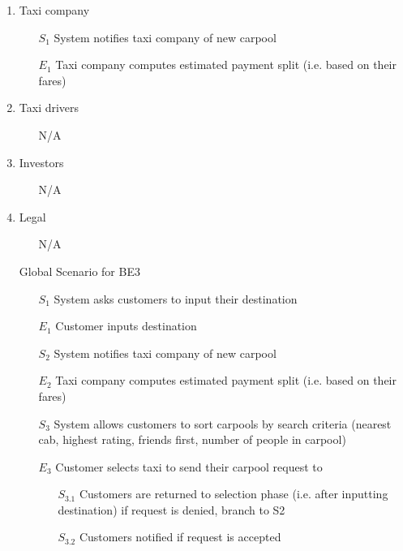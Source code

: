 \documentclass[]{article}
\begin{document}
\begin{enumerate}[{\textbf{BE}}1.]
\begin{enumerate}[{VP3}.1]
        \item Taxi company
            \begin{enumerate}
                \item[$S_1$] System notifies taxi company of new carpool
                \item[$E_1$] Taxi company computes estimated payment split (i.e. based on their fares)
            \end{enumerate}
        \item Taxi drivers
            \begin{enumerate}
                \item[N/A]
            \end{enumerate}
        \item Investors
            \begin{enumerate}
                \item[N/A]
            \end{enumerate}
        \item Legal
            \begin{enumerate}
                \item[N/A]
            \end{enumerate}
        \item[Global] Scenario for BE3
            \begin{enumerate}
                \item[$S_1$] System asks customers to input their destination
                \item[$E_1$] Customer inputs destination
                \item[$S_2$] System notifies taxi company of new carpool
                \item[$E_2$] Taxi company computes estimated payment split (i.e. based on their fares)
                \item[$S_3$] System allows customers to sort carpools by search criteria (nearest cab, highest rating, friends first, number of people in carpool)
                \item[$E_3$] Customer selects taxi to send their carpool request to
                \begin{enumerate}
                    \item[$S_{3.1}$] Customers are returned to selection phase (i.e. after inputting destination) if request is denied, branch to S2
                    \item[$S_{3.2}$] Customers notified if request is accepted
                \end{enumerate}

\end{enumerate}
\end{enumerate}
\end{enumerate}
\end{document}
